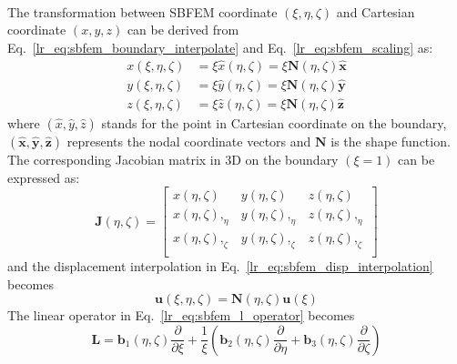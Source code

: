 \paragraph{}
The transformation between SBFEM coordinate $(\xi, \eta, \zeta)$ and Cartesian coordinate $(x, y, z)$ can be derived from Eq.~\ref{lr_eq:sbfem_boundary_interpolate} and Eq.~\ref{lr_eq:sbfem_scaling} as:
\begin{subequations}
\begin{align}
    x(\xi, \eta, \zeta) & = \xi \hat{x}(\eta, \zeta)  = \xi \mathbf{N}(\eta, \zeta) \mathbf{\hat{x}} \\
    y(\xi, \eta, \zeta) & = \xi \hat{y}(\eta, \zeta)  = \xi \mathbf{N}(\eta, \zeta) \mathbf{\hat{y}} \\
    z(\xi, \eta, \zeta) & = \xi \hat{z}(\eta, \zeta)  = \xi \mathbf{N}(\eta, \zeta) \mathbf{\hat{z}}
\end{align}
\end{subequations}
%
where $(\hat{x}, \hat{y}, \hat{z})$ stands for the point in Cartesian coordinate on the boundary, $(\mathbf{\hat{x}}, \mathbf{\hat{y}}, \mathbf{\hat{z}})$ represents the nodal coordinate vectors and $\mathbf{N}$ is the shape function.
The corresponding Jacobian matrix in 3D on the boundary $(\xi = 1)$ can be expressed as:
\begin{equation}
    \mathbf{J} (\eta, \zeta) =
    \begin{bmatrix}
        x(\eta, \zeta)      &   y(\eta, \zeta)      &   z(\eta, \zeta)  \\
        x(\eta, \zeta),_{\eta}      &   y(\eta, \zeta),_{\eta}      &   z(\eta, \zeta),_{\eta}  \\
        x(\eta, \zeta),_{\zeta}      &   y(\eta, \zeta),_{\zeta}      &   z(\eta, \zeta),_{\zeta}  \\
    \end{bmatrix}
\end{equation}
%
and the displacement interpolation in Eq.~\ref{lr_eq:sbfem_disp_interpolation} becomes
\begin{equation}
    \mathbf{u}(\xi, \eta, \zeta) = \mathbf{N} (\eta, \zeta) \mathbf{u} (\xi)
\end{equation}
%
The linear operator in Eq.~\ref{lr_eq:sbfem_l_operator} becomes
\begin{equation}
    \mathbf{L} = \mathbf{b}_1 (\eta, \zeta) \frac{\partial}{\partial \xi} +
    \frac{1}{\xi}\left(
        \mathbf{b}_2 (\eta, \zeta) \frac{\partial}{\partial \eta} +
        \mathbf{b}_3 (\eta, \zeta) \frac{\partial}{\partial \zeta}
    \right)
\end{equation}
